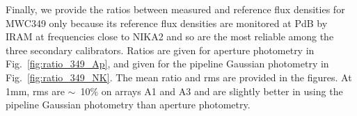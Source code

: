 Finally, we provide the ratios between measured and reference flux densities for MWC349 only because
its reference flux densities are monitored at PdB
by IRAM at frequencies close to NIKA2 and so are the most reliable among the three secondary calibrators.
Ratios are given for aperture photometry in Fig.~\ref{fig:ratio_349_Ap}, and  given for
the pipeline Gaussian photometry in Fig.~\ref{fig:ratio_349_NK}.
The mean ratio and rms are provided in the figures. At 1mm, rms are $\sim$~10\% on arrays A1 and A3 
and are slightly better in using the pipeline Gaussian photometry than aperture photometry.








